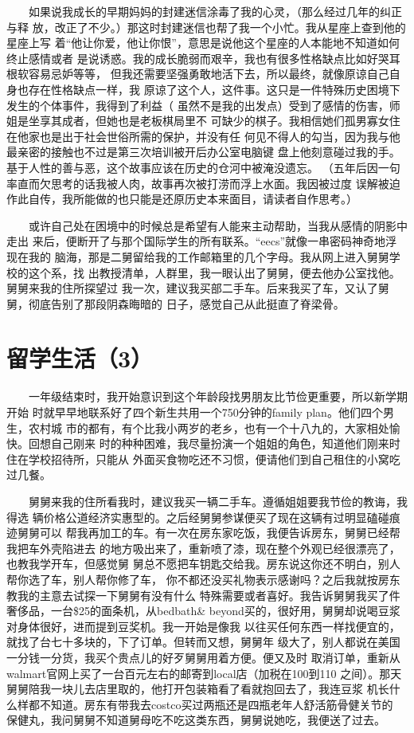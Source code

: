 \documentclass[12pt]{book}
\begin{document}
　　如果说我成长的早期妈妈的封建迷信涂毒了我的心灵，（那么经过几年的纠正与释
放，改正了不少。）那这时封建迷信也帮了我一个小忙。我从星座上查到他的星座上写
着“他让你爱，他让你恨”，意思是说他这个星座的人本能地不知道如何终止感情或者
是说诱惑。我的成长脆弱而艰辛，我也有很多性格缺点比如好哭耳根软容易忌妒等等，
但我还需要坚强勇敢地活下去，所以最终，就像原谅自己自身也存在性格缺点一样，我
原谅了这个人，这件事。这只是一件特殊历史困境下发生的个体事件，我得到了利益（
虽然不是我的出发点）受到了感情的伤害，师姐是坐享其成者，但她也是老板棋局里不
可缺少的棋子。我相信她们孤男寡女住在他家也是出于社会世俗所需的保护，并没有任
何见不得人的勾当，因为我与他最亲密的接触也不过是第三次培训被开后办公室电脑键
盘上他刻意碰过我的手。基于人性的善与恶，这个故事应该在历史的仓河中被淹没遗忘。
（五年后因一句率直而欠思考的话我被人肉，故事再次被打涝而浮上水面。我因被过度
误解被迫作此自传，我所能做的也只能是还原历史本来面目，请读者自作思考。）

　　或许自己处在困境中的时候总是希望有人能来主动帮助，当我从感情的阴影中走出
来后，便断开了与那个国际学生的所有联系。“eecs”就像一串密码神奇地浮现在我的
脑海，那是二舅留给我的工作邮箱里的几个字母。我从网上进入舅舅学校的这个系，找
出教授清单，人群里，我一眼认出了舅舅，便去他办公室找他。舅舅来我的住所探望过
我一次，建议我买部二手车。后来我买了车，又认了舅舅，彻底告别了那段阴森晦暗的
日子，感觉自己从此挺直了脊梁骨。
\section{留学生活（3）}
\label{sec-6-3}

　　一年级结束时，我开始意识到这个年龄段找男朋友比节俭更重要，所以新学期开始
时就早早地联系好了四个新生共用一个750分钟的family plan。他们四个男生，农村城
市的都有，有个比我小两岁的老乡，也有一个十八九的，大家相处愉快。回想自己刚来
时的种种困难，我尽量扮演一个姐姐的角色，知道他们刚来时住在学校招待所，只能从
外面买食物吃还不习惯，便请他们到自己租住的小窝吃过几餐。

　　舅舅来我的住所看我时，建议我买一辆二手车。遵循姐姐要我节俭的教诲，我得选
辆价格公道经济实惠型的。之后经舅舅参谋便买了现在这辆有过明显磕碰痕迹舅舅可以
帮我再加工的车。有一次在房东家吃饭，我便告诉房东，舅舅已经帮我把车外壳陷进去
的地方吸出来了，重新喷了漆，现在整个外观已经很漂亮了，也教我学开车，但感觉舅
舅总不愿把车钥匙交给我。房东说这你还不明白，别人帮你选了车，别人帮你修了车，
你不都还没买礼物表示感谢吗？之后我就按房东教我的主意去试探一下舅舅有没有什么
特殊需要或者喜好。我告诉舅舅我买了件奢侈品，一台\$25的面条机，从bedbath\&
beyond买的，很好用，舅舅却说喝豆浆对身体很好，进而提到豆奖机。我一开始是像我
以往买任何东西一样找便宜的，就找了台七十多块的，下了订单。但转而又想，舅舅年
级大了，别人都说在美国一分钱一分货，我买个贵点儿的好歹舅舅用着方便。便又及时
取消订单，重新从walmart官网上买了一台百元左右的邮寄到local店（加税在100到110
之间）。那天舅舅陪我一块儿去店里取的，他打开包装箱看了看就抱回去了，我连豆浆
机长什么样都不知道。房东有带我去costco买过两瓶还是四瓶老年人舒活筋骨健关节的
保健丸，我问舅舅不知道舅母吃不吃这类东西，舅舅说她吃，我便送了过去。
\end{document}
